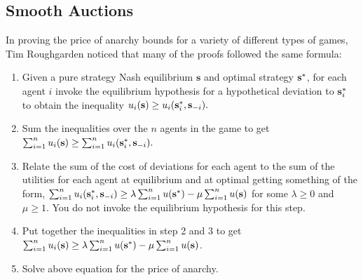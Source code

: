 \documentclass[12pt,twoside]{reedthesis}
\begin{document}
\subsection{Smooth Auctions}

In proving the price of anarchy bounds for a variety of different types of games, Tim Roughgarden noticed that many of the proofs followed the same formula:

\begin{enumerate}
	\item Given a pure strategy Nash equilibrium $\textbf{s}$ and optimal strategy $\textbf{s}^{*}$, for each agent $i$ invoke the equilibrium hypothesis for a hypothetical deviation to $\textbf{s}^*_i$ to obtain the inequality $u_i(\textbf{s}) \geq u_i(\textbf{s}_i^*,\textbf{s}_{-i}).$
	
	\item Sum the inequalities over the $n$ agents in the game to get $\sum_{i=1}^{n}u_i(\textbf{s}) \geq \sum_{i=1}^{n}u_i(\textbf{s}_i^*,\textbf{s}_{-i}).$
	
	
	\item Relate the sum of the cost of deviations for each agent to the sum of the utilities for each agent at equilibrium and at optimal getting something of the form, $\sum_{i=1}^{n}u_i(\textbf{s}_i^*,\textbf{s}_{-i}) \geq \lambda \sum_{i=1}^{n}u(\textbf{s}^*) - \mu \sum_{i=1}^{n}u(\textbf{s})$ for some $\lambda \geq 0$ and $\mu \geq 1$. You do not invoke the equilibrium hypothesis for this step.
	
	\item Put together the inequalities in step 2 and 3 to get $\sum_{i=1}^{n}u_i(\textbf{s}) \geq \lambda \sum_{i=1}^{n}u(\textbf{s}^*) - \mu \sum_{i=1}^{n}u(\textbf{s})$.
	
	\item Solve above equation for the price of anarchy.
\end{enumerate}
\end{document}
